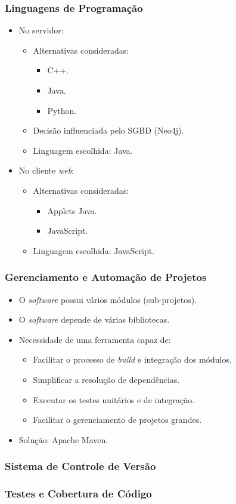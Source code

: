 \frame
{
\frametitle{Linguagens de Programação}
\begin{itemize}
	\item No servidor:
	\begin{itemize}
		\item Alternativas consideradas:
		\begin{itemize}
			\item C++.
			\item Java.
			\item Python.
		\end{itemize}
		\item Decisão influenciada pelo SGBD (Neo4j).
		\item Linguagem escolhida: Java.
	\end{itemize}
	\item No cliente \emph{web}:
	\begin{itemize}
		\item Alternativas consideradas:
		\begin{itemize}
			\item Applets Java.
			\item JavaScript.
		\end{itemize}
		\item Linguagem escolhida: JavaScript.
	\end{itemize}
\end{itemize}
}

\frame
{
\frametitle{Gerenciamento e Automação de Projetos}
	\begin{itemize}
		\item O \emph{software} possui vários módulos (sub-projetos).
		\item O \emph{software} depende de várias bibliotecas.
		\item Necessidade de uma ferramenta capaz de:
		\begin{itemize}
			\item Facilitar o processo de \emph{build} e integração dos módulos.
			\item Simplificar a resolução de dependências.
			\item Executar os testes unitários e de integração.
			\item Facilitar o gerenciamento de projetos grandes.
		\end{itemize}
		\item Solução: Apache Maven.
	\end{itemize}
}

\frame
{
\frametitle{Sistema de Controle de Versão}
}

\frame
{
\frametitle{Testes e Cobertura de Código}
}
